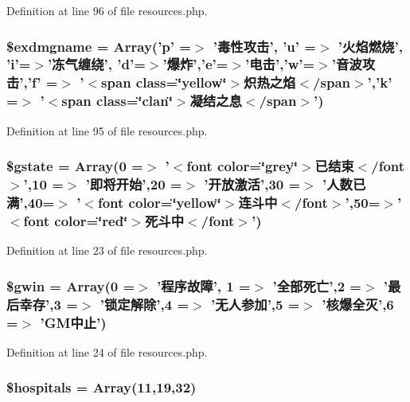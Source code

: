Definition at line 96 of file resources.\+php.

\hypertarget{resources_8php_ae3d186083abb3ad845df2562e1c1df79}{
\subsubsection[{\$exdmgname}]{\setlength{\rightskip}{0pt plus 5cm}\$exdmgname = Array('p' =$>$ '毒性攻击', 'u' =$>$ '火焰燃烧', 'i'=$>$'冻气缠绕', 'd'=$>$'爆炸','e'=$>$'电击','w'=$>$'音波攻击','f' =$>$ '$<$span class=\char`\"{}yellow\char`\"{}$>$炽热之焰$<$/span$>$','k' =$>$ '$<$span class=\char`\"{}clan\char`\"{}$>$凝结之息$<$/span$>$')}}\label{resources_8php_ae3d186083abb3ad845df2562e1c1df79}


Definition at line 95 of file resources.\+php.

\hypertarget{resources_8php_a5aed3a3ce44a1f7125854d31c7f61a6b}{
\subsubsection[{\$gstate}]{\setlength{\rightskip}{0pt plus 5cm}\$gstate = Array(0 =$>$ '$<$font color=\char`\"{}grey\char`\"{}$>$已结束$<$/font$>$',10 =$>$ '即将开始',20 =$>$ '开放激活',30 =$>$ '人数已满',40=$>$ '$<$font color=\char`\"{}yellow\char`\"{}$>$连斗中$<$/font$>$',50=$>$'$<$font color=\char`\"{}red\char`\"{}$>$死斗中$<$/font$>$')}}\label{resources_8php_a5aed3a3ce44a1f7125854d31c7f61a6b}


Definition at line 23 of file resources.\+php.

\hypertarget{resources_8php_a2957a034129d3598a5d35640b8906532}{
\subsubsection[{\$gwin}]{\setlength{\rightskip}{0pt plus 5cm}\$gwin = Array(0 =$>$ '程序故障', 1 =$>$ '全部死亡',2 =$>$ '最后幸存',3 =$>$ '锁定解除',4 =$>$ '无人参加',5 =$>$ '核爆全灭',6 =$>$ 'G\+M中止')}}\label{resources_8php_a2957a034129d3598a5d35640b8906532}


Definition at line 24 of file resources.\+php.

\hypertarget{resources_8php_a522f774b7af7274c8142c2bf00854709}{
\subsubsection[{\$hospitals}]{\setlength{\rightskip}{0pt plus 5cm}\$hospitals = Array(11,19,32)}}\label{resources_8php_a522f774b7af7274c8142c2bf00854709}


